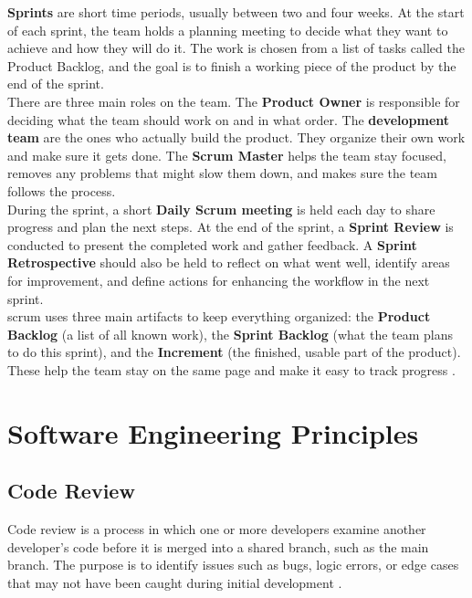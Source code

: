 \textbf{Sprints} are short time periods, usually between two and four weeks. At the start of each sprint, the team holds a planning meeting to decide what they want to achieve and how they will do it. The work is chosen from a list of tasks called the Product Backlog, and the goal is to finish a working piece of the product by the end of the sprint. \\

There are three main roles on the team. The \textbf{Product Owner} is responsible for deciding what the team should work on and in what order. The \textbf{development team} are the ones who actually build the product. They organize their own work and make sure it gets done. The \textbf{Scrum Master} helps the team stay focused, removes any problems that might slow them down, and makes sure the team follows the process.\\

During the sprint, a short \textbf{Daily Scrum meeting} is held each day to share progress and plan the next steps. At the end of the sprint, a \textbf{Sprint Review} is conducted to present the completed work and gather feedback. A \textbf{Sprint Retrospective} should also be held to reflect on what went well, identify areas for improvement, and define actions for enhancing the workflow in the next sprint.\\

\gls{scrum} uses three main artifacts to keep everything organized: the \textbf{Product Backlog} (a list of all known work), the \textbf{Sprint Backlog} (what the team plans to do this sprint), and the \textbf{Increment} (the finished, usable part of the product). These help the team stay on the same page and make it easy to track progress \cite{scrumguides:scrum}.

\section{Software Engineering Principles}
\label{sec:software-engineering-principles}

\subsection{Code Review}
\label{subsec:code-review}

Code review is a process in which one or more developers examine another developer’s code before it is merged into a shared branch, such as the main branch. The purpose is to identify issues such as bugs, logic errors, or edge cases that may not have been caught during initial development \cite{gitlab:code-review}. \\

